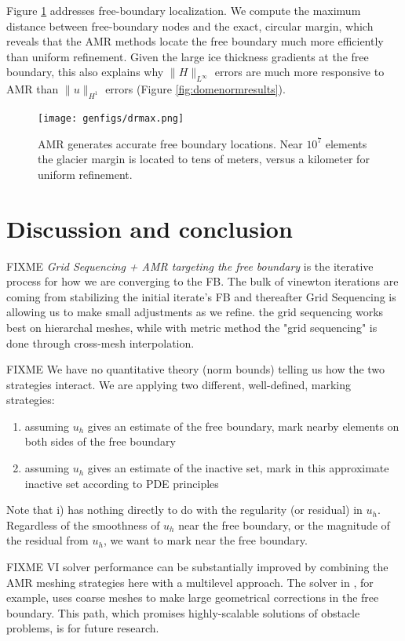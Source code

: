 \documentclass[]{interact}
\theoremstyle{plain}%
\theoremstyle{definition}
\theoremstyle{remark}
\begin{document}
Figure \ref{fig:domeradiusresults} addresses free-boundary localization.  We compute the maximum distance between free-boundary nodes and the exact, circular margin, which reveals that the AMR methods locate the free boundary much more efficiently than uniform refinement.  Given the large ice thickness gradients at the free boundary, this also explains why $\|H\|_{L^\infty}$ errors are much more responsive to AMR than $\|u\|_{H^1}$ errors (Figure \ref{fig:domenormresults}).

\begin{figure}[ht]
\centering
\texttt{[image: genfigs/drmax.png]}
\caption{AMR generates accurate free boundary locations.  Near $10^7$ elements the glacier margin is located to tens of meters, versus a kilometer for uniform refinement.}
\label{fig:domeradiusresults}
\end{figure}


\section{Discussion and conclusion} \label{sec:conclusion}

FIXME \emph{Grid Sequencing + AMR targeting the free boundary} is the iterative process for how we are converging to the FB.  The bulk of vinewton iterations are coming from stabilizing the initial iterate's FB and thereafter Grid Sequencing is allowing us to make small adjustments as we refine.  the grid sequencing works best on hierarchal meshes, while with metric method the "grid sequencing" is done through cross-mesh interpolation.

FIXME We have no quantitative theory (norm bounds) telling us how the two strategies interact.  We are applying two different, well-defined, marking strategies:
\begin{enumerate}
\item assuming $u_h$ gives an estimate of the free boundary, mark nearby elements on both sides of the free boundary
\item assuming $u_h$ gives an estimate of the inactive set, mark in this approximate inactive set according to PDE principles
\end{enumerate}
Note that i) has nothing directly to do with the regularity (or residual) in $u_h$.  Regardless of the smoothness of $u_h$ near the free boundary, or the magnitude of the residual from $u_h$, we want to mark near the free boundary.

FIXME VI solver performance can be substantially improved by combining the AMR meshing strategies here with a multilevel approach.  The solver in \cite{BuelerFarrell2024}, for example, uses coarse meshes to make large geometrical corrections in the free boundary.  This path, which promises highly-scalable solutions of obstacle problems, is for future research.
\end{document}
